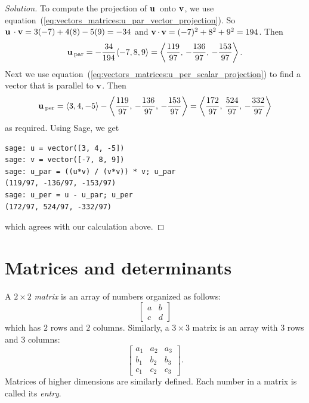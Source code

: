 \begin{proof}[Solution]
To compute the projection of $\operatorname*{\mathbf{u}}{}$ onto $\operatorname*{\mathbf{v}}$, we use
equation~(\ref{eq:vectors_matrices:u_par_vector_projection}). So
$\operatorname*{\mathbf{u}}{} \cdot \operatorname*{\mathbf{v}} = 3(-7) + 4(8) - 5(9) = -34$ and
$\operatorname*{\mathbf{v}} \cdot \operatorname*{\mathbf{v}} = (-7)^2 + 8^2 + 9^2 = 194$. Then
\[
\operatorname*{\mathbf{u}}{}_{\text{par}}
=
-\frac{34}{194} \langle -7, 8, 9 \rangle
=
\left\langle
\frac{119}{97},\, -\frac{136}{97},\, -\frac{153}{97}
\right\rangle.
\]
Next we use
equation~(\ref{eq:vectors_matrices:u_per_scalar_projection}) to find a
vector that is parallel to $\operatorname*{\mathbf{v}}$. Then
\[
\operatorname*{\mathbf{u}}{}_{\text{per}}
=
\langle 3, 4, -5 \rangle -
\left\langle
\frac{119}{97},\, -\frac{136}{97},\, -\frac{153}{97}
\right\rangle
=
\left\langle
\frac{172}{97},\, \frac{524}{97},\, -\frac{332}{97}
\right\rangle
\]
as required. Using Sage, we get
%
\begin{lstlisting}
sage: u = vector([3, 4, -5])
sage: v = vector([-7, 8, 9])
sage: u_par = ((u*v) / (v*v)) * v; u_par
(119/97, -136/97, -153/97)
sage: u_per = u - u_par; u_per
(172/97, 524/97, -332/97)
\end{lstlisting}
%
which agrees with our calculation above.
\end{proof}



\section{Matrices and determinants}

A $2 \times 2$ \emph{matrix} is an array of numbers
organized as follows:
%
\begin{equation}
\label{eq:vectors_matrices:2_by_2_matrix}
\begin{bmatrix}
a & b \\
c & d
\end{bmatrix}
\end{equation}
%
which has $2$ rows and $2$ columns. Similarly, a $3 \times 3$ matrix
is an array with $3$ rows and $3$ columns:
%
\begin{equation}
\label{eq:vectors_matrices:3_by_3_matrix}
\begin{bmatrix}
a_1 & a_2 & a_3 \\
b_1 & b_2 & b_3 \\
c_1 & c_2 & c_3
\end{bmatrix}.
\end{equation}
%
Matrices of higher dimensions are similarly defined. Each number in a
matrix is called its \emph{entry}.

